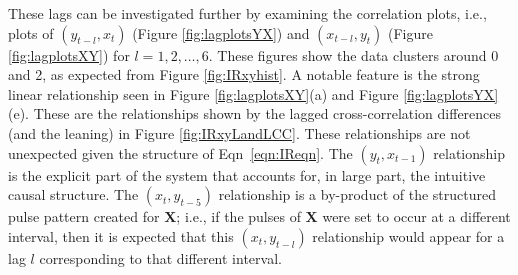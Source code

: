 
These lags can be investigated further by examining the correlation plots, i.e., plots of $(y_{t-l},x_t)$ (Figure \ref{fig:lagplotsYX}) and $(x_{t-l},y_t)$ (Figure \ref{fig:lagplotsXY}) for $l=1,2,\ldots,6$.  These figures show the data clusters around 0 and 2, as expected from Figure \ref{fig:IRxyhist}.  A notable feature is the strong linear relationship seen in Figure \ref{fig:lagplotsXY}(a) and Figure \ref{fig:lagplotsYX}(e).  These are the relationships shown by the lagged cross-correlation differences (and the leaning) in Figure \ref{fig:IRxyLandLCC}.  These relationships are not unexpected given the structure of Eqn\ \ref{eqn:IReqn}.  The $(y_t,x_{t-1})$ relationship is the explicit part of the system that accounts for, in large part, the intuitive causal structure.  The $(x_t,y_{t-5})$ relationship is a by-product of the structured pulse pattern created for $\mathbf{X}$; i.e., if the pulses of $\mathbf{X}$ were set to occur at a different interval, then it is expected that this $(x_t,y_{t-l})$ relationship would appear for a lag $l$ corresponding to that different interval.  

